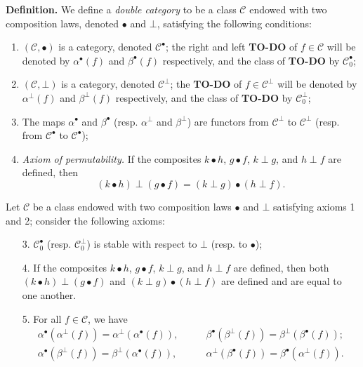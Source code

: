 \documentclass{article}
\newenvironment{rmenv}[1]
  {\phantomsection\par\medskip\noindent\textbf{#1.}\rmfamily}
  {\par\medskip}
\newcommand{\todo}{{\color{purple}\textbf{TO-DO }}}
\newcommand{\CC}{\mathcal{C}}
\newcommand{\dotc}{{\mathbin{\bullet}}}
\newcommand{\botc}{{\mathbin{\bot}}}
\begin{document}
\begin{rmenv}{Definition}
  We define a \emph{double category} to be a class $\CC$ endowed with two composition laws, denoted $\dotc$ and $\botc$, satisfying the following conditions:

  \begin{enumerate}
    \item $(\CC,\dotc)$ is a category, denoted $\CC^\dotc$;
      the right and left \todo of $f\in\CC$ will be denoted by $\alpha^\dotc(f)$ and $\beta^\dotc(f)$ respectively, and the class of \todo by $\CC_0^\dotc$;
    \item $(\CC,\botc)$ is a category, denoted $\CC^\botc$;
      the \todo of $f\in\CC^\botc$ will be denoted by $\alpha^\botc(f)$ and $\beta^\botc(f)$ respectively, and the class of \todo by $\CC_0^\botc$;
    \item The maps $\alpha^\dotc$ and $\beta^\dotc$ (resp. $\alpha^\botc$ and $\beta^\botc$) are functors from $\CC^\botc$ to $\CC^\botc$ (resp. from $\CC^\dotc$ to $\CC^\dotc$);
    \item \emph{Axiom of permutability.}
      If the composites $k\dotc h$, $g\dotc f$, $k\botc g$, and $h\botc f$ are defined, then
      \[
        (k\dotc h)\botc(g\dotc f)
        = (k\botc g)\dotc(h\botc f).
      \]
  \end{enumerate}

  Let $\CC$ be a class endowed with two composition laws $\dotc$ and $\botc$ satisfying axioms 1 and 2; consider the following axioms:

  \begin{enumerate}
    \item[3\textquotesingle.]
      $\CC_0^\dotc$ (resp. $\CC_0^\botc$) is stable with respect to $\botc$ (resp. to $\dotc$);
    \item[4\textquotesingle.]
      If the composites $k\dotc h$, $g\dotc f$, $k\botc g$, and $h\botc f$ are defined, then both $(k\dotc h)\botc(g\dotc f)$ and $(k\botc g)\dotc(h\botc f)$ are defined and are equal to one another.
    \item[5.]
      For all $f\in\CC$, we have
      \[
        \begin{aligned}
          \alpha^\dotc(\alpha^\botc(f))
          = \alpha^\botc(\alpha^\dotc(f)),
          &\qquad
          \beta^\dotc(\beta^\botc(f))
          = \beta^\botc(\beta^\dotc(f));
        \\\alpha^\dotc(\beta^\botc(f))
          = \beta^\botc(\alpha^\dotc(f)),
          &\qquad
          \alpha^\botc(\beta^\dotc(f))
          = \beta^\dotc(\alpha^\botc(f)).
        \end{aligned}
      \]
  \end{enumerate}
\end{rmenv}
\end{document}

